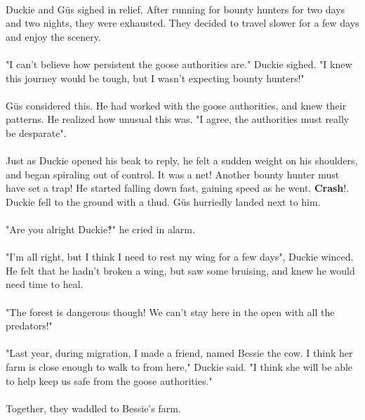 \paragraph{} Duckie and G{\"u}s sighed in relief. After running for bounty hunters for two days and two nights, they were exhausted. They decided to travel slower for a few days and enjoy the scenery. 
\paragraph{} "I can't believe how persistent the goose authorities are." Duckie sighed. "I knew this journey would be tough, but I wasn't expecting bounty hunters!"
\paragraph{} G{\"u}s considered this. He had worked with the goose authorities, and knew their patterns. He realized how unusual this was. "I agree, the authorities must really be desparate".
\paragraph{} Just as Duckie opened his beak to reply, he felt a sudden weight on his shoulders, and began spiraling out of control. It was a net! Another bounty hunter must have set a trap! He started falling down fast, gaining speed as he went. \textbf{Crash}!. Duckie fell to the ground with a thud. G{\"u}s hurriedly landed next to him. 
\paragraph{} "Are you alright Duckie‽" he cried in alarm.
\paragraph{} "I'm all right, but I think I need to rest my wing for a few days", Duckie winced. He felt that he hadn't broken a wing, but saw some bruising, and knew he would need time to heal. 
 \paragraph{} "The forest is dangerous though! We can't stay here in the open with all the predators!"
 \paragraph{} "Last year, during migration, I made a friend, named Bessie the cow. I think her farm is close enough to walk to from here," Duckie said. "I think she will be able to help keep us safe from the goose authorities."
 \paragraph{} Together, they waddled to Bessie's farm.